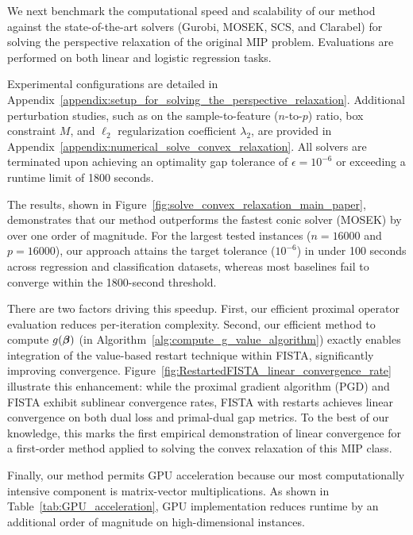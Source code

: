 


We next benchmark the computational speed and scalability of our method against the state-of-the-art solvers (Gurobi, MOSEK, SCS, and Clarabel) for solving the perspective relaxation of the original MIP problem.
Evaluations are performed on both linear and logistic regression tasks.


Experimental configurations are detailed in Appendix~\ref{appendix:setup_for_solving_the_perspective_relaxation}.
Additional perturbation studies, such as on the sample-to-feature ($n$-to-$p$) ratio, box constraint $M$, and $\ell_2$ regularization coefficient $\lambda_2$, are provided in Appendix~\ref{appendix:numerical_solve_convex_relaxation}.
All solvers are terminated upon achieving an optimality gap tolerance of $\epsilon=10^{-6}$ or exceeding a runtime limit of 1800 seconds.

The results, shown in Figure~\ref{fig:solve_convex_relaxation_main_paper}, demonstrates that our method outperforms the fastest conic solver (MOSEK) by over one order of magnitude.
For the largest tested instances ($n=16000$ and $p=16000$), our approach attains the target tolerance ($10^{-6}$) in under 100 seconds across regression and classification datasets, whereas most baselines fail to converge within the 1800-second threshold.

There are two factors driving this speedup.
First, our efficient proximal operator evaluation reduces per-iteration complexity.
Second, our efficient method to compute $g(\bm{\beta})$ (in Algorithm~\ref{alg:compute_g_value_algorithm}) exactly enables integration of the value-based restart technique within FISTA, significantly improving convergence.
Figure~\ref{fig:RestartedFISTA_linear_convergence_rate} illustrate this enhancement: while the proximal gradient algorithm (PGD) and FISTA exhibit sublinear convergence rates, FISTA with restarts achieves linear convergence on both dual loss and primal-dual gap metrics.
To the best of our knowledge, this marks the first empirical demonstration of linear convergence for a first-order method applied to solving the convex relaxation of this MIP class.

Finally, our method permits GPU acceleration because our most computationally intensive component is matrix-vector multiplications.
As shown in Table~\ref{tab:GPU_acceleration}, GPU implementation reduces runtime by an additional order of magnitude on high-dimensional instances.



